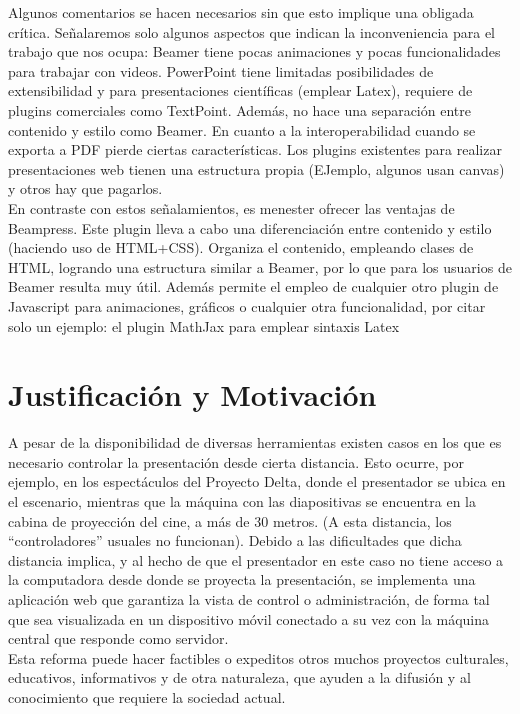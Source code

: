 \begin{introduction}
Algunos comentarios se hacen necesarios sin que esto implique una obligada crítica. Señalaremos solo algunos aspectos que indican la inconveniencia para el trabajo que nos ocupa: Beamer tiene pocas animaciones y pocas funcionalidades para trabajar con videos. PowerPoint tiene limitadas posibilidades de extensibilidad y para presentaciones científicas (emplear Latex), requiere de plugins comerciales como TextPoint. Además, no hace una separación entre contenido y estilo como Beamer. En cuanto a la interoperabilidad cuando se exporta a PDF pierde ciertas características. Los plugins existentes para realizar presentaciones web tienen una estructura propia (EJemplo, algunos usan canvas) y otros hay que pagarlos.\\
En contraste con estos señalamientos, es menester ofrecer las ventajas de Beampress. Este plugin lleva a cabo una diferenciación entre contenido y estilo (haciendo uso de HTML+CSS). Organiza el contenido, empleando clases de HTML, logrando una estructura similar a Beamer, por lo que para los usuarios de Beamer resulta muy útil. Además permite el empleo de cualquier otro plugin de Javascript para animaciones, gráficos o cualquier otra funcionalidad, por citar solo un ejemplo: el plugin MathJax para emplear sintaxis Latex  


\section*{Justificación y Motivación}

A pesar de la disponibilidad de diversas herramientas existen casos en los que es necesario controlar la presentación desde cierta distancia.  Esto ocurre, por ejemplo, en los espectáculos del Proyecto Delta, donde el presentador se ubica en el escenario, mientras que la máquina con las diapositivas se encuentra en la cabina de proyección del cine, a más de 30 metros.  (A esta distancia, los ``controladores'' usuales no funcionan). Debido a las dificultades que dicha distancia implica, y al hecho de que el presentador en este caso no tiene acceso a la computadora desde donde se proyecta la presentación, se implementa una aplicación web que garantiza la vista de control o administración, de forma tal que sea visualizada en un dispositivo móvil conectado a su vez con la máquina central que responde como servidor. \\

Esta reforma puede hacer factibles o expeditos otros muchos proyectos culturales, educativos, informativos y de otra naturaleza, que ayuden a la difusión y al conocimiento que requiere la sociedad actual.


\end{introduction}
